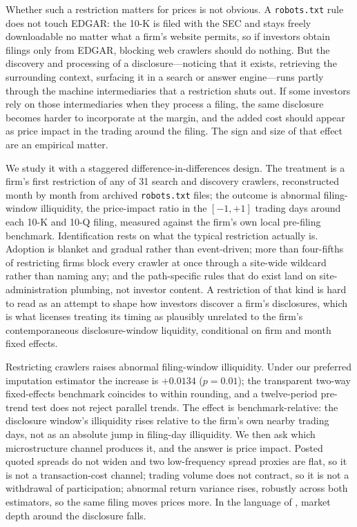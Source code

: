 \documentclass[12pt]{article}
\begin{document}
Whether such a restriction matters for prices is not obvious. A \texttt{robots.txt} rule does not touch EDGAR: the 10-K is filed with the SEC and stays freely downloadable no matter what a firm's website permits, so if investors obtain filings only from EDGAR, blocking web crawlers should do nothing. But the discovery and processing of a disclosure---noticing that it exists, retrieving the surrounding context, surfacing it in a search or answer engine---runs partly through the machine intermediaries that a restriction shuts out. If some investors rely on those intermediaries when they process a filing, the same disclosure becomes harder to incorporate at the margin, and the added cost should appear as price impact in the trading around the filing. The sign and size of that effect are an empirical matter.

We study it with a staggered difference-in-differences design. The treatment is a firm's first restriction of any of 31 search and discovery crawlers, reconstructed month by month from archived \texttt{robots.txt} files; the outcome is abnormal filing-window illiquidity, the \citet{Amihud2002} price-impact ratio in the $[-1,+1]$ trading days around each 10-K and 10-Q filing, measured against the firm's own local pre-filing benchmark. Identification rests on what the typical restriction actually is. Adoption is blanket and gradual rather than event-driven; more than four-fifths of restricting firms block every crawler at once through a site-wide wildcard rather than naming any; and the path-specific rules that do exist land on site-administration plumbing, not investor content. A restriction of that kind is hard to read as an attempt to shape how investors discover a firm's disclosures, which is what licenses treating its timing as plausibly unrelated to the firm's contemporaneous disclosure-window liquidity, conditional on firm and month fixed effects.

Restricting crawlers raises abnormal filing-window illiquidity. Under our preferred imputation estimator the increase is $+0.0134$ ($p=0.01$); the transparent two-way fixed-effects benchmark coincides to within rounding, and a twelve-period pre-trend test does not reject parallel trends. The effect is benchmark-relative: the disclosure window's illiquidity rises relative to the firm's own nearby trading days, not as an absolute jump in filing-day illiquidity. We then ask which microstructure channel produces it, and the answer is price impact. Posted quoted spreads do not widen and two low-frequency spread proxies are flat, so it is not a transaction-cost channel; trading volume does not contract, so it is not a withdrawal of participation; abnormal return variance rises, robustly across both estimators, so the same filing moves prices more. In the language of \citet{Kyle1985}, market depth around the disclosure falls.
\end{document}
